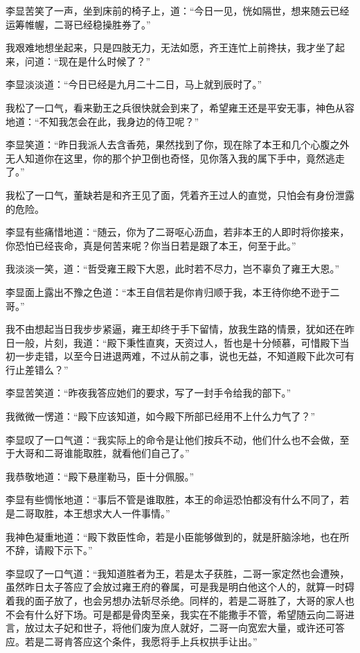 李显苦笑了一声，坐到床前的椅子上，道：“今日一见，恍如隔世，想来随云已经运筹帷幄，二哥已经稳操胜券了。”

我艰难地想坐起来，只是四肢无力，无法如愿，齐王连忙上前搀扶，我才坐了起来，问道：“现在是什么时候了？”

李显淡淡道：“今日已经是九月二十二日，马上就到辰时了。”

我松了一口气，看来勤王之兵很快就会到来了，希望雍王还是平安无事，神色从容地道：“不知我怎会在此，我身边的侍卫呢？”

李显笑道：“昨日我派人去含香苑，果然找到了你，现在除了本王和几个心腹之外无人知道你在这里，你的那个护卫倒也奇怪，见你落入我的属下手中，竟然逃走了。”

我松了一口气，董缺若是和齐王见了面，凭着齐王过人的直觉，只怕会有身份泄露的危险。

李显有些痛惜地道：“随云，你为了二哥呕心沥血，若非本王的人即时将你接来，你恐怕已经丧命，真是何苦来呢？你当日若是跟了本王，何至于此。”

我淡淡一笑，道：“哲受雍王殿下大恩，此时若不尽力，岂不辜负了雍王大恩。”

李显面上露出不豫之色道：“本王自信若是你肯归顺于我，本王待你绝不逊于二哥。”

我不由想起当日我步步紧逼，雍王却终于手下留情，放我生路的情景，犹如还在昨日一般，片刻，我道：“殿下秉性直爽，天资过人，哲也是十分倾慕，可惜殿下当初一步走错，以至今日进退两难，不过从前之事，说也无益，不知道殿下此次可有行止差错么？”

李显苦笑道：“昨夜我答应她们的要求，写了一封手令给我的部下。”

我微微一愣道：“殿下应该知道，如今殿下所部已经用不上什么力气了？”

李显叹了一口气道：“我实际上的命令是让他们按兵不动，他们什么也不会做，至于大哥和二哥谁能取胜，就看他们自己了。”

我恭敬地道：“殿下悬崖勒马，臣十分佩服。”

李显有些惆怅地道：“事后不管是谁取胜，本王的命运恐怕都没有什么不同了，若是二哥取胜，本王想求大人一件事情。”

我神色凝重地道：“殿下救臣性命，若是小臣能够做到的，就是肝脑涂地，也在所不辞，请殿下示下。”

李显叹了一口气道：“我知道胜者为王，若是太子获胜，二哥一家定然也会遭殃，虽然昨日太子答应了会放过雍王府的眷属，可是我是明白他这个人的，就算一时碍着我的面子放了，也会另想办法斩尽杀绝。同样的，若是二哥胜了，大哥的家人也不会有什么好下场。可是都是骨肉至亲，我实在不能撒手不管，希望随云向二哥进言，放过太子妃和世子，将他们废为庶人就好，二哥一向宽宏大量，或许还可答应。若是二哥肯答应这个条件，我愿将手上兵权拱手让出。”


